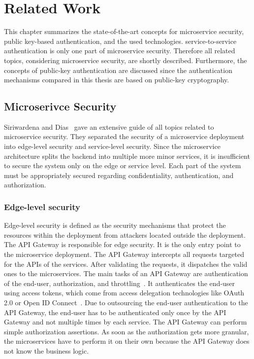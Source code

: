 \chapter{Related Work}
\label{cha:Related_Work}
This chapter summarizes the state-of-the-art concepts for microservice security, public key-based authentication, and the used technologies.
service-to-service authentication is only one part of microservice security.
Therefore all related topics, considering microservice security, are shortly described.
Furthermore, the concepts of public-key authentication are discussed since the authentication mechanisms compared in this thesis are based on public-key cryptography.

\section{Microserivce Security}
Siriwardena and Dias~\cite{dias2020microservices} gave an extensive guide of all topics related to microservice security. 
They separated the security of a microservice deployment into edge-level security and service-level security.
Since the microservice architecture splits the backend into multiple more minor services, it is insufficient to secure the system only on the edge or service level.
Each part of the system must be appropriately secured regarding confidentiality, authentication, and authorization.

\subsection{Edge-level security}
Edge-level security is defined as the security mechanisms that protect the resources within the deployment from attackers located outside the deployment. 
The API Gateway is responsible for edge security.
It is the only entry point to the microservice deployment.
The API Gateway intercepts all requests targeted for the APIs of the services.
After validating the requests, it dispatches the valid ones to the microservices.
The main tasks of an API Gateway are authentication of the end-user, authorization, and throttling~\cite{dias2020microservices}.
It authenticates the end-user using access tokens, which come from access delegation technologies like OAuth 2.0 or Open ID Connect~\cite{siriwardena2014advanced}.
Due to outsourcing the end-user authentication to the API Gateway, the end-user has to be authenticated only once by the API Gateway and not multiple times by each service.
The API Gateway can perform simple authorization assertions. 
As soon as the authorization gets more granular, the microservices have to perform it on their own because the API Gateway does not know the business logic.

